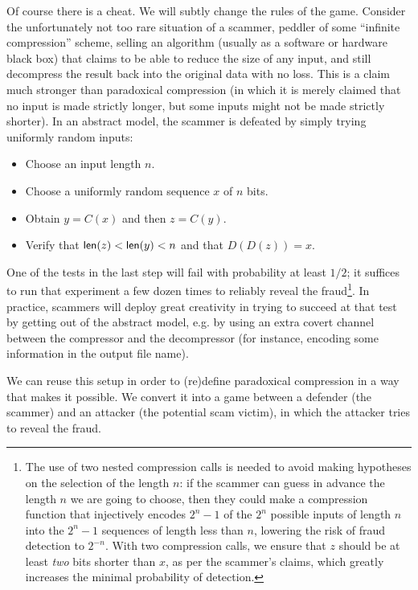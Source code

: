 \documentclass{llncs}
\newcommand{\bitlength}{\text{\textsf{len}}}
\begin{document}
Of course there is a cheat. We will subtly change the rules of the game.
Consider the unfortunately not too rare situation of a scammer, peddler
of some ``infinite compression'' scheme, selling an algorithm (usually
as a software or hardware black box) that claims to be able to reduce
the size of any input, and still decompress the result back into the
original data with no loss. This is a claim much stronger than
paradoxical compression (in which it is merely claimed that no input is
made strictly longer, but some inputs might not be made strictly
shorter). In an abstract model, the scammer is defeated by simply trying
uniformly random inputs:
\begin{itemize}

    \item Choose an input length $n$.

    \item Choose a uniformly random sequence $x$ of $n$ bits.

    \item Obtain $y = C(x)$ and then $z = C(y)$.

    \item Verify that $\bitlength(z) < \bitlength(y) < n$ and
    that $D(D(z)) = x$.

\end{itemize}
One of the tests in the last step will fail with probability at least
$1/2$; it suffices to run that experiment a few dozen times to reliably
reveal the fraud\footnote{The use of two nested compression calls is
needed to avoid making hypotheses on the selection of the length $n$: if
the scammer can guess in advance the length $n$ we are going to choose,
then they could make a compression function that injectively encodes
$2^n-1$ of the $2^n$ possible inputs of length $n$ into the $2^n-1$
sequences of length less than $n$, lowering the risk of fraud detection
to $2^{-n}$. With two compression calls, we ensure that $z$ should be at
least \emph{two} bits shorter than $x$, as per the scammer's claims,
which greatly increases the minimal probability of detection.}. In
practice, scammers will deploy great creativity in trying to succeed at
that test by getting out of the abstract model, e.g. by using an extra
covert channel between the compressor and the decompressor (for
instance, encoding some information in the output file name).

We can reuse this setup in order to (re)define paradoxical compression
in a way that makes it possible. We convert it into a game between a
defender (the scammer) and an attacker (the potential scam victim), in
which the attacker tries to reveal the fraud.
\end{document}

